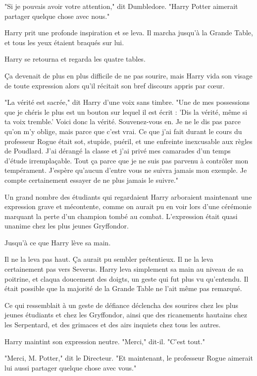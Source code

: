 "Si je pouvais avoir votre attention," dit Dumbledore. "Harry Potter aimerait partager quelque chose avec nous."

Harry prit une profonde inspiration et se leva. Il marcha jusqu'à la Grande Table, et tous les yeux étaient braqués sur lui.

Harry se retourna et regarda les quatre tables.

Ça devenait de plus en plus difficile de ne pas sourire, mais Harry vida son visage de toute expression alors qu'il récitait son bref discours appris par cœur.

"La vérité est sacrée," dit Harry d'une voix sans timbre. "Une de mes possessions que je chéris le plus est un bouton sur lequel il est écrit : 'Dis la vérité, même si ta voix tremble.' Voici donc la vérité. Souvenez-vous en. Je ne le dis pas parce qu'on m'y oblige, mais parce que c'est vrai. Ce que j'ai fait durant le cours du professeur Rogue était sot, stupide, puéril, et une enfreinte inexcusable aux règles de Poudlard. J'ai dérangé la classe et j'ai privé mes camarades d'un temps d'étude irremplaçable. Tout ça parce que je ne suis pas parvenu à contrôler mon tempérament. J'espère qu'aucun d'entre vous ne suivra jamais mon exemple. Je compte certainement essayer de ne plus jamais le suivre."

Un grand nombre des étudiants qui regardaient Harry arboraient maintenant une expression grave et mécontente, comme on aurait pu en voir lors d'une cérémonie marquant la perte d'un champion tombé au combat. L'expression était quasi unanime chez les plus jeunes Gryffondor.

Jusqu'à ce que Harry lève sa main.

Il ne la leva pas haut. Ça aurait pu sembler prétentieux. Il ne la leva certainement pas vers Severus. Harry leva simplement sa main au niveau de sa poitrine, et claqua doucement des doigts, un geste qui fut plus vu qu'entendu. Il était possible que la majorité de la Grande Table ne l'ait même pas remarqué.

Ce qui ressemblait à un geste de défiance déclencha des sourires chez les plus jeunes étudiants et chez les Gryffondor, ainsi que des ricanements hautains chez les Serpentard, et des grimaces et des airs inquiets chez tous les autres.

Harry maintint son expression neutre. "Merci," dit-il. "C'est tout."

"Merci, M. Potter," dit le Directeur. "Et maintenant, le professeur Rogue aimerait lui aussi partager quelque chose avec vous."

